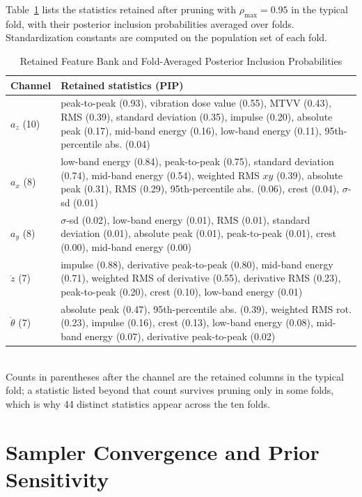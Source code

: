 \documentclass[lettersize,journal]{IEEEtran}
\newif\ifdraftnotes
\newcommand{\draftnote}[1]{\ifdraftnotes\textcolor{red}{\textbf{[TODO: #1]}}\fi}
\begin{document}
Table~\ref{tab:bank} lists the statistics retained after pruning with $\rho_{\max}=0.95$ in the typical fold, with their posterior inclusion probabilities averaged over folds. Standardization constants are computed on the population set of each fold. \draftnote{Add the removed near-duplicates and the column each was merged into, from the per-fold prune reports.}

\begin{table}[t]
\caption{Retained Feature Bank and Fold-Averaged Posterior Inclusion Probabilities}
\label{tab:bank}
\centering
\setlength{\tabcolsep}{4pt}
\footnotesize
\begin{tabular}{lp{6.2cm}}
\toprule
Channel & Retained statistics (PIP) \\
\midrule
$a_z$ (10) & peak-to-peak (0.93), vibration dose value (0.55), MTVV (0.43), RMS (0.39), standard deviation (0.35), impulse (0.20), absolute peak (0.17), mid-band energy (0.16), low-band energy (0.11), 95th-percentile abs. (0.04) \\
$a_x$ (8) & low-band energy (0.84), peak-to-peak (0.75), standard deviation (0.74), mid-band energy (0.54), weighted RMS $xy$ (0.39), absolute peak (0.31), RMS (0.29), 95th-percentile abs. (0.06), crest (0.04), $\sigma$-sd (0.01) \\
$a_y$ (8) & $\sigma$-sd (0.02), low-band energy (0.01), RMS (0.01), standard deviation (0.01), absolute peak (0.01), peak-to-peak (0.01), crest (0.00), mid-band energy (0.00) \\
$\dot z$ (7) & impulse (0.88), derivative peak-to-peak (0.80), mid-band energy (0.71), weighted RMS of derivative (0.55), derivative RMS (0.23), peak-to-peak (0.20), crest (0.10), low-band energy (0.01) \\
$\dot\theta$ (7) & absolute peak (0.47), 95th-percentile abs. (0.39), weighted RMS rot. (0.23), impulse (0.16), crest (0.13), low-band energy (0.08), mid-band energy (0.07), derivative peak-to-peak (0.02) \\
\bottomrule
\end{tabular}
\\[2pt]
{\footnotesize Counts in parentheses after the channel are the retained columns in the typical fold; a statistic listed beyond that count survives pruning only in some folds, which is why 44 distinct statistics appear across the ten folds.}
\end{table}

\section{Sampler Convergence and Prior Sensitivity}
\label{app:convergence}
\end{document}
